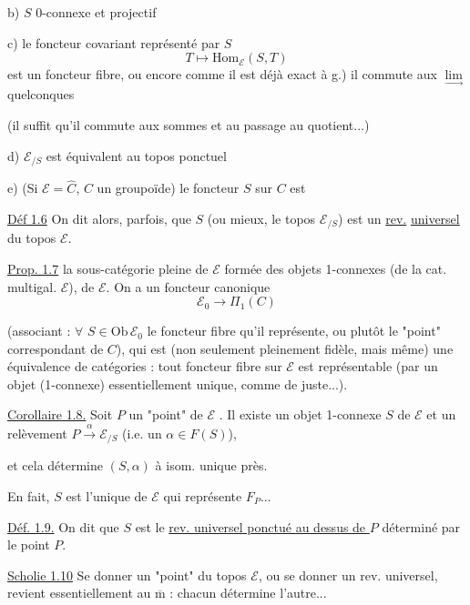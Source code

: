 b) \(S\)  0-connexe et projectif

c) le foncteur covariant représenté par \(S\)
\[
T\longmapsto\mathrm{Hom}_{\mathcal E}(S,T)
\]
est un foncteur fibre, ou encore
comme il est déjà exact à g.) il commute aux
\(\underset{\longrightarrow}{\lim}\) quelconques

 (il suffit qu'il commute aux sommes et au passage
au quotient...)

d) \(\mathcal E_{/S}\) est équivalent au topos ponctuel

e) (Si \(\mathcal E=\widehat C\), \(C\) un groupoïde) le foncteur
\(S\) sur \(C\) est 

\uline{Déf 1.6} On dit alors, parfois, que \(S\) (ou mieux, le topos
\(\mathcal E_{/S}\)) est un \uline{rev.} \uline{universel} du topos
 \(\mathcal E\).

\uline{Prop. 1.7}
 la sous-catégorie pleine de
\(\mathcal E\) formée des objets 1-connexes
(de la cat. multigal. \(\mathcal E\)),
  de \(\mathcal E\).
On a  un foncteur canonique
\[
\mathcal E_0\longrightarrow
\Pi_1(C)
\]

(associant : \(\forall\) \(S\in\mathrm{Ob}\,\mathcal E_0\)
le foncteur fibre qu'il représente, ou plutôt le "point" correspondant
de \(C\)), qui est
(non seulement pleinement fidèle, mais même) une équivalence de
catégories : tout foncteur fibre sur \(\mathcal E\) est représentable
(par un objet (1-connexe) essentiellement unique, comme de juste...).


\uline{Corollaire 1.8.} Soit \(P\) un "point" de \(\mathcal E\)
.
Il existe un objet 1-connexe \(S\) de \(\mathcal E\) et un relèvement
\(P\xrightarrow{\alpha}\mathcal E_{/S}\)
(i.e. un \(\alpha\in F(S)\)),


et cela détermine \((S,\alpha)\) à isom. unique près.

En fait, \(S\) est l'unique 
de \(\mathcal E\) qui représente \(F_P\)...

\uline{Déf. 1.9.} On dit que \(S\)
 est le
\uline{rev. universel ponctué au dessus de \(P\)} déterminé
par le point \(P\).

\uline{Scholie 1.10} Se donner un "point" du \unsure{:}
topos  \(\mathcal E\), ou se donner un
rev. universel, revient essentiellement au
\(\overline{\mathrm m}\) : chacun détermine l'autre...
